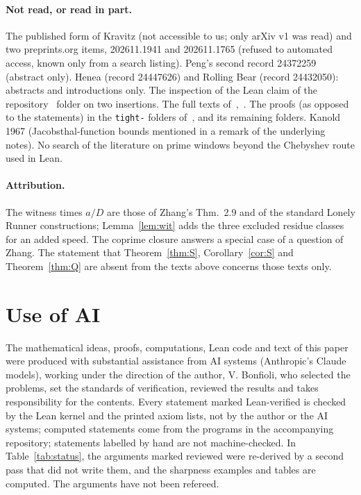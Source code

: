 \documentclass[11pt]{article}
\theoremstyle{definition}
\theoremstyle{remark}
\begin{document}
\paragraph{Not read, or read in part.}
The published form of Kravitz (not accessible to us; only arXiv v1 was read) and two preprints.org items, 202611.1941 and 202611.1765 (refused to automated access, known only from a search listing). Peng's second record 24372259 (abstract only). Henea (record 24447626) and Rolling Bear (record 24432050): abstracts and introductions only. The inspection of the Lean claim of the repository~\cite{R1337} folder on two insertions. The full texts of~\cite{YGB},~\cite{C}. The proofs (as opposed to the statements) in the \texttt{tight-} folders of~\cite{R1337}, and its remaining folders. Kanold 1967 (Jacobsthal-function bounds mentioned in a remark of the underlying notes). No search of the literature on prime windows beyond the Chebyshev route used in Lean.

\paragraph{Attribution.}
The witness times $a/D$ are those of Zhang's Thm.~2.9 and of the standard Lonely Runner constructions; Lemma~\ref{lem:wit} adds the three excluded residue classes for an added speed. The coprime closure answers a special case of a question of Zhang. The statement that Theorem~\ref{thm:S}, Corollary~\ref{cor:S} and Theorem~\ref{thm:Q} are absent from the texts above concerns those texts only.

\section*{Use of AI}
The mathematical ideas, proofs, computations, Lean code and text of this paper were produced with substantial assistance from AI systems (Anthropic's Claude models), working under the direction of the author, V. Bonfioli, who selected the problems, set the standards of verification, reviewed the results and takes responsibility for the contents. Every statement marked Lean-verified is checked by the Lean kernel and the printed axiom lists, not by the author or the AI systems; computed statements come from the programs in the accompanying repository; statements labelled by hand are not machine-checked. In Table~\ref{tab:status}, the arguments marked reviewed were re-derived by a second pass that did not write them, and the sharpness examples and tables are computed. The arguments have not been refereed.
\end{document}
